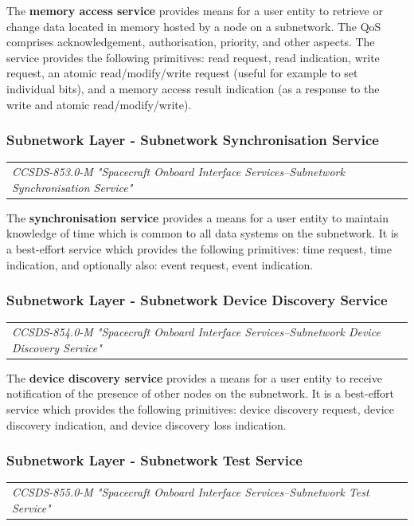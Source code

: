 The \textbf{memory access service} provides means for a user entity to retrieve or change data located in memory hosted by a node on a subnetwork. The QoS comprises acknowledgement, authorisation, priority, and other aspects. The service provides the following primitives: read request, read indication, write request, an atomic read/modify/write request (useful for example to set individual bits), and a memory access result indication (as a response to the write and atomic read/modify/write).

\subsubsection{Subnetwork Layer - Subnetwork Synchronisation Service}

\begin{tabular}{l}
\textit{CCSDS-853.0-M "Spacecraft Onboard Interface Services--Subnetwork Synchronisation Service" \cite{CCSDS-853.0-M}} 
\end{tabular}

The \textbf{synchronisation service} provides a means for a user entity to maintain knowledge of time which is common to all data systems on the subnetwork. It is a best-effort service which provides the following primitives: time request, time indication, and optionally also: event request, event indication.

\subsubsection{Subnetwork Layer - Subnetwork Device Discovery Service}

\begin{tabular}{l}
\textit{CCSDS-854.0-M "Spacecraft Onboard Interface Services--Subnetwork Device Discovery Service" \cite{CCSDS-854.0-M}} 
\end{tabular}

The \textbf{device discovery service} provides a means for a user entity to receive notification of the presence of other nodes on the subnetwork. It is a best-effort service which provides the following primitives: device discovery request, device discovery indication, and device discovery loss indication.

\subsubsection{Subnetwork Layer - Subnetwork Test Service}

\begin{tabular}{l}
\textit{CCSDS-855.0-M "Spacecraft Onboard Interface Services--Subnetwork Test Service" \cite{CCSDS-855.0-M}} 
\end{tabular}

